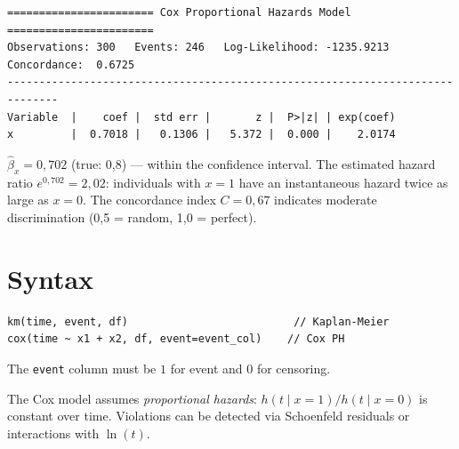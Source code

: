 \begin{lstlisting}[language={}, basicstyle=\ttfamily\small,
  frame=none, numbers=none, backgroundcolor=\color{codbg},
  xleftmargin=0pt, xrightmargin=0pt, breaklines=false]
======================= Cox Proportional Hazards Model =======================
Observations: 300   Events: 246   Log-Likelihood: -1235.9213
Concordance:  0.6725
------------------------------------------------------------------------------
Variable  |    coef |  std err |       z |  P>|z| | exp(coef)
x         |  0.7018 |   0.1306 |   5.372 |  0.000 |    2.0174
\end{lstlisting}

$\hat\beta_x = 0{,}702$ (true: 0{,}8) — within the confidence interval.
The estimated hazard ratio $e^{0{,}702} = 2{,}02$: individuals with $x=1$ have
an instantaneous hazard twice as large as $x=0$. The concordance index
$C = 0{,}67$ indicates moderate discrimination (0{,}5 = random, 1{,}0 = perfect).

\section{Syntax}

\begin{lstlisting}
km(time, event, df)                          // Kaplan-Meier
cox(time ~ x1 + x2, df, event=event_col)    // Cox PH
\end{lstlisting}

The \lstinline{event} column must be $1$ for event and $0$ for censoring.

\begin{nota}
  The Cox model assumes \emph{proportional hazards}: $h(t \mid x=1)/h(t \mid x=0)$
  is constant over time. Violations can be detected via Schoenfeld residuals
  or interactions with $\ln(t)$.
\end{nota}
